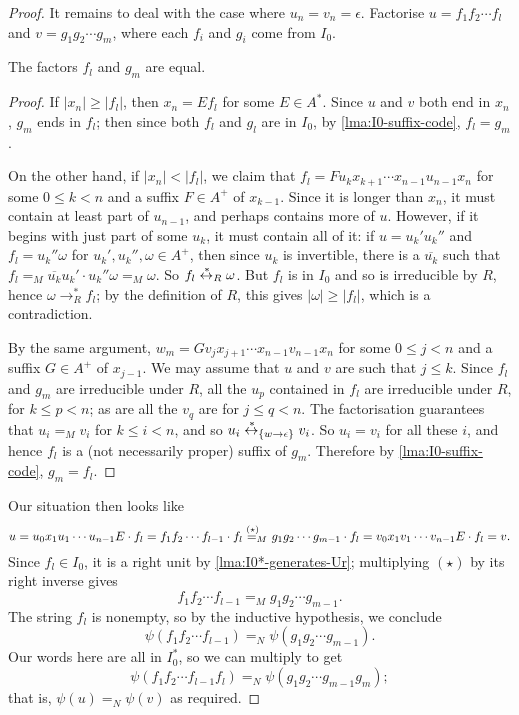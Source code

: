 \documentclass[noindex,noinsetproof,emphthm,12pt]{lmaths}
\newcommand{\leftrightst}{\mathrel{\smash{\stackrel{\hspace{0.1em}\ast}{\leftrightarrow}}}}
\begin{document}
\begin{proof}
	It remains to deal with the case where $u_n = v_n = \epsilon$. Factorise $u = f_1 f_2 \cdots f_l$ and $v = g_1 g_2 \cdots g_m$, where each $f_i$ and $g_i$ come from $I_0$.

	\begin{claim*}
		The factors $f_l$ and $g_m$ are equal.
	\end{claim*}
	\begin{proof}	
	If $|x_n| \ge |f_l|$, then $x_n = Ef_l$ for some $E \in A^*$. Since $u$ and $v$ both end in $x_n$, $g_m$ ends in $f_l$; then since both $f_l$ and $g_l$ are in $I_0$, by \cref{lma:I0-suffix-code}, $f_l = g_m$.

	On the other hand, if $|x_n| < |f_l|$, we claim that $f_l = Fu_k x_{k+1} \cdots x_{n-1}u_{n-1}x_n$ for some $0 \le k < n$ and a suffix $F \in A^+$ of $x_{k-1}$. Since it is longer than $x_n$, it must contain at least part of $u_{n-1}$, and perhaps contains more of $u$. However, if it begins with just part of some $u_k$, it must contain all of it: if $u = u_k'u_k''$ and $f_l = u_k''\omega$ for $u_k', u_k'', \omega \in A^+$, then since $u_k$ is invertible, there is a $\overline{u_k}$ such that $f_l =_M \overline{u_k}u_k' \cdot u_k''\omega =_M \omega$. So $f_l \leftrightst_R \omega$. But $f_l$ is in $I_0$ and so is irreducible by $R$, hence $\omega \to^*_R f_l$; by the definition of $R$, this gives $|\omega| \ge |f_l|$, which is a contradiction.

		By the same argument, $w_m = Gv_jx_{j+1} \cdots x_{n-1}v_{n-1}x_n$ for some $0 \le j < n$ and a suffix $G \in A^+$ of $x_{j-1}$. We may assume that $u$ and $v$ are such that $j \le k$. Since $f_l$ and $g_m$ are irreducible under $R$, all the $u_p$ contained in $f_l$ are irreducible under $R$, for $k \le p < n$; as are all the $v_q$ are for $j \le q < n$. The factorisation guarantees that $u_i =_M v_i$ for $k \le i < n$, and so $u_i \leftrightst_{\{w\to\epsilon\}} v_i$. So $u_i = v_i$ for all these $i$, and hence $f_l$ is a (not necessarily proper) suffix of $g_m$. Therefore by \cref{lma:I0-suffix-code}, $g_m = f_l$.
	\end{proof}

	Our situation then looks like
		\[ u =  u_0x_1u_1\cdots u_{n-1}E \cdot f_l = f_1f_2\cdots f_{l-1} \cdot f_l \stackrel{(\star)\hphantom{{}_M}}{=_M} g_1g_2\cdots g_{m-1} \cdot f_l = v_0x_1v_1\cdots v_{n-1}E \cdot f_l = v. \]
	Since $f_l \in I_0$, it is a right unit by \cref{lma:I0*-generates-Ur}; multiplying $(\star)$ by its right inverse gives
		\[ f_1f_2\cdots f_{l-1} =_M g_1g_2\cdots g_{m-1}. \]
	The string $f_l$ is nonempty, so by the inductive hypothesis, we conclude
		\[ \psi(f_1 f_2 \cdots f_{l-1}) =_N \psi(g_1 g_2\cdots g_{m-1}). \]
	Our words here are all in $I_0^*$, so we can multiply to get
		\[ \psi(f_1 f_2 \cdots f_{l-1} f_l) =_N \psi(g_1 g_2\cdots g_{m-1} g_m); \]
	that is, $\psi(u) =_N \psi(v)$ as required.
\end{proof}
\end{document}
